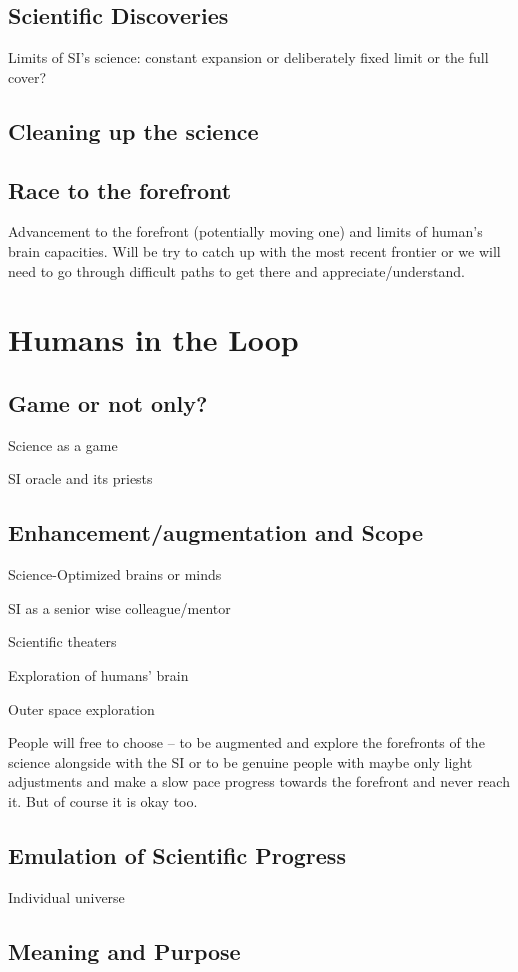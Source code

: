 \documentclass[a4paper,11pt]{article}
\begin{document}
        \subsection{Scientific Discoveries}

        Limits of SI's science: constant expansion or deliberately fixed limit or the full cover?

        \subsection{Cleaning up the science}

        \subsection{Race to the forefront}

        Advancement to the forefront (potentially moving one) and limits of human's brain capacities. Will be try to catch up with the most recent frontier or we will need to go through difficult paths to get there and appreciate/understand.

    \section{Humans in the Loop}

        \subsection{Game or not only?}

        Science as a game

        SI oracle and its priests

        \subsection{Enhancement/augmentation and Scope}

        Science-Optimized brains or minds

        SI as a senior wise colleague/mentor

        Scientific theaters

        Exploration of humans' brain

        Outer space exploration

        People will free to choose -- to be augmented and explore the forefronts of the science alongside with the SI or to be genuine people with maybe only light adjustments and make a slow pace progress towards the forefront and never reach it. But of course it is okay too.

        \subsection{Emulation of Scientific Progress}

        Individual universe

        \subsection{Meaning and Purpose}






\printbibliography
\end{document}
